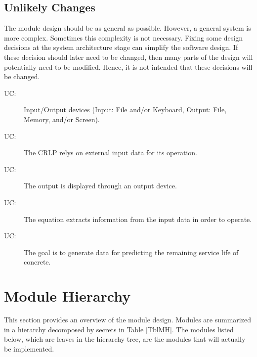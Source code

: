\documentclass[12pt, titlepage]{article}
\newcounter{ucnum}
\newcommand{\uctheucnum}{UC\theucnum}
\begin{document}
\subsection{Unlikely Changes} \label{SecUchange}

The module design should be as general as possible. However, a general system is more complex. Sometimes this complexity is not necessary. Fixing some design decisions at the system architecture stage can simplify the software design. If these decision should later need to be changed, then many parts of the design will potentially need to be modified. Hence, it is not intended that these decisions will be changed.

\begin{description}
    \item[ \uctheucnum \label{ucIO}:] Input/Output devices (Input: File and/or Keyboard, Output: File, Memory, and/or Screen).
    \item[ \uctheucnum \label{ucSource}:] The CRLP relys on external input data for its operation.
    \item[ \uctheucnum \label{ucSource}:] The output is displayed through an output device.
    \item[ \uctheucnum \label{ucCal}:] The equation extracts information from the input data in order to operate.
    \item[ \uctheucnum \label{ucGoal}:] The goal is to generate data for predicting the remaining service life of concrete.

\end{description}

\section{Module Hierarchy} \label{SecMH}

This section provides an overview of the module design. Modules are summarized
in a hierarchy decomposed by secrets in Table \ref{TblMH}. The modules listed
below, which are leaves in the hierarchy tree, are the modules that will actually be implemented.
\end{document}
